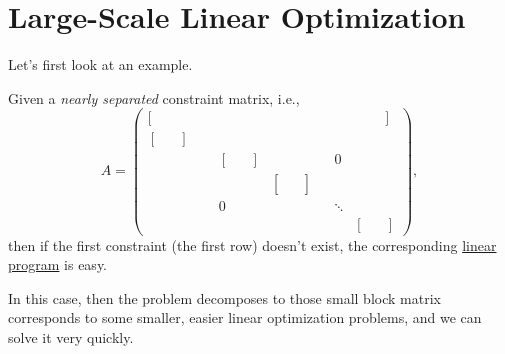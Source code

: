 \chapter{Large-Scale Linear Optimization}
Let's first look at an example.
\begin{eg}
	Given a \emph{nearly separated} constraint matrix, i.e.,
	\[
		A = \left(\begin{array}{cccccc}
				[\quad\quad\quad\quad                            &                                              &                                                        &  &        & \quad\ \quad]                                     \\
				\left[\begin{array}{cc} & \\ &\end{array}\right] &                                              &                                                        &  &        &                                                   \\
				                                                 & \left[\begin{array}{cc} & \end{array}\right] &                                                        &  & 0      &                                                   \\
				                                                 &                                              & \left[\begin{array}{cc} & \\ & \\ & \end{array}\right] &  &        &                                                   \\
				                                                 & 0                                            &                                                        &  & \ddots                                                     \\
				                                                 &                                              &                                                        &  &        & \left[\begin{array}{cc} & \\ & \end{array}\right]
			\end{array}\right),
	\]
	then if the first constraint (the first row) doesn't exist, the corresponding \hyperref[def:general-linear-programming-problem]{linear program} is easy.
\end{eg}
\begin{explanation}
	In this case, then the problem decomposes to those small block matrix corresponds to some smaller, easier linear optimization problems, and we can solve it very quickly.
\end{explanation}

